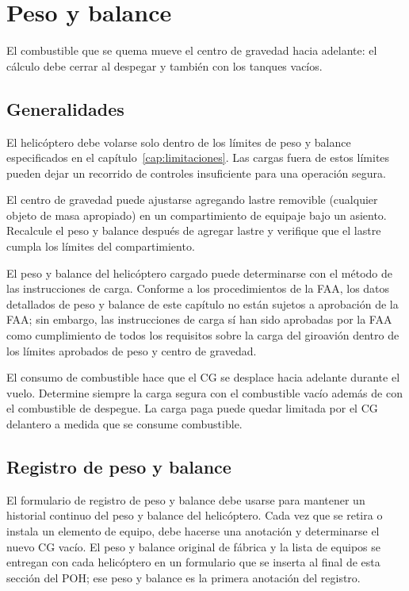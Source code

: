 \chapter{Peso y balance}
\label{cap:peso-balance}

\opening{El combustible que se quema mueve el centro de gravedad hacia adelante: el cálculo debe cerrar al despegar y también con los tanques vacíos.}

\section{Generalidades}

El helicóptero debe volarse solo dentro de los límites de peso y balance especificados en el capítulo~\ref{cap:limitaciones}. Las cargas fuera de estos límites pueden dejar un recorrido de controles insuficiente para una operación segura.

El centro de gravedad puede ajustarse agregando lastre removible (cualquier objeto de masa apropiado) en un compartimiento de equipaje bajo un asiento. Recalcule el peso y balance después de agregar lastre y verifique que el lastre cumpla los límites del compartimiento.

El peso y balance del helicóptero cargado puede determinarse con el método de las instrucciones de carga. Conforme a los procedimientos de la FAA, los datos detallados de peso y balance de este capítulo no están sujetos a aprobación de la FAA; sin embargo, las instrucciones de carga sí han sido aprobadas por la FAA como cumplimiento de todos los requisitos sobre la carga del giroavión dentro de los límites aprobados de peso y centro de gravedad.

\begin{precaucion}
El consumo de combustible hace que el CG se desplace hacia adelante durante el vuelo. Determine siempre la carga segura con el combustible vacío además de con el combustible de despegue. La carga paga puede quedar limitada por el CG delantero a medida que se consume combustible.
\end{precaucion}

\section{Registro de peso y balance}

El formulario de registro de peso y balance debe usarse para mantener un historial continuo del peso y balance del helicóptero. Cada vez que se retira o instala un elemento de equipo, debe hacerse una anotación y determinarse el nuevo CG vacío. El peso y balance original de fábrica y la lista de equipos se entregan con cada helicóptero en un formulario que se inserta al final de esta sección del POH; ese peso y balance es la primera anotación del registro.

